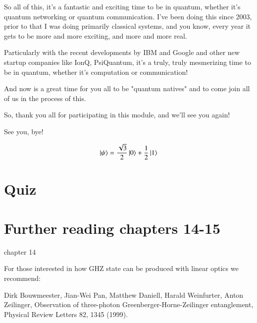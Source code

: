 \rrr So all of this, it's a fantastic and exciting time to be in quantum, whether it's quantum networking or quantum communication. I've been doing this since 2003, prior to that I was doing primarily classical systems, and you know, every year it gets to be more and more exciting, and more and more real.

\mmm Particularly with the recent developments by IBM and Google and other new startup companies like IonQ, PsiQuantum, it's a truly, truly mesmerizing time to be in quantum, whether it's computation or communication!

\rrr And now is a great time for you all to be "quantum natives" and to come join all of us in the process of this.

So, thank you all for participating in this module, and we'll see you again!

\mmm See you, bye!




\newpage
\begin{exercises}
\begin{equation*}
\left| \psi \right\rangle = \frac{\sqrt{3}}{2}\left| 0 \right\rangle + \frac{1}{2}\left| 1 \right\rangle
\end{equation*}


\end{exercises}


\newpage
\section*{Quiz}


\section*{Further reading chapters 14-15}

chapter 14

For those interested in how GHZ state can be produced with linear optics we recommend:

Dirk Bouwmeester, Jian-Wei Pan, Matthew Daniell, Harald Weinfurter, Anton Zeilinger, Observation of three-photon Greenberger-Horne-Zeilinger entanglement, Physical Review Letters 82, 1345 (1999).


